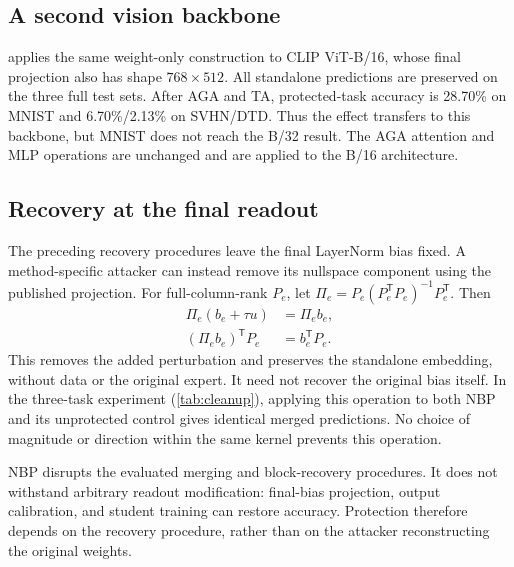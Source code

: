 \subsection{A second vision backbone}

 applies the same weight-only construction to CLIP ViT-B/16, whose final projection also has shape $768\times512$. All standalone predictions are preserved on the three full test sets. After AGA and TA, protected-task accuracy is 28.70\% on MNIST and 6.70\%/2.13\% on SVHN/DTD. Thus the effect transfers to this backbone, but MNIST does not reach the B/32 result. The AGA attention and MLP operations are unchanged and are applied to the B/16 architecture.

\subsection{Recovery at the final readout}
\label{sec:limitations}

The preceding recovery procedures leave the final LayerNorm bias fixed. A method-specific attacker can instead remove its nullspace component using the published projection. For full-column-rank $P_e$, let $\Pi_e=P_e(P_e^{\mathsf T}P_e)^{-1}P_e^{\mathsf T}$. Then
\begin{equation}
 \begin{aligned}
 \Pi_e(b_e+\tau u)&=\Pi_e b_e,\\
 (\Pi_e b_e)^{\mathsf T}P_e&=b_e^{\mathsf T}P_e.
 \end{aligned}
 \label{eq:cleanup}
\end{equation}
This removes the added perturbation and preserves the standalone embedding, without data or the original expert. It need not recover the original bias itself. In the three-task experiment (\cref{tab:cleanup}), applying this operation to both NBP and its unprotected control gives identical merged predictions. No choice of magnitude or direction within the same kernel prevents this operation.

NBP disrupts the evaluated merging and block-recovery procedures. It does not withstand arbitrary readout modification: final-bias projection, output calibration, and student training can restore accuracy. Protection therefore depends on the recovery procedure, rather than on the attacker reconstructing the original weights.
